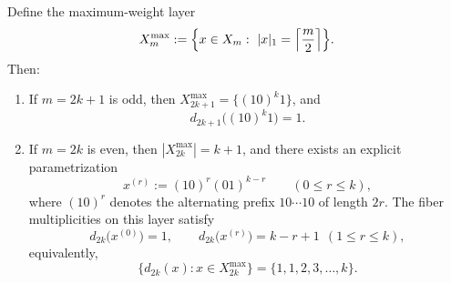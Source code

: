 \begin{conclusion}[Classification of stable words in the maximum-weight layer and closed fiber spectrum: \texorpdfstring{$|x|_1=\lceil m/2\rceil$}{|x|=ceil(m/2)}]\label{con:xi-terminal-max-weight-layer-fiber-spectrum-closed}
Define the maximum-weight layer
\[
X_m^{\max}:=\Bigl\{x\in X_m:\ |x|_1=\Bigl\lceil\frac{m}{2}\Bigr\rceil\Bigr\}.
\]
Then:
\begin{enumerate}
  \item If \(m=2k+1\) is odd, then \(X_{2k+1}^{\max}=\{(10)^k1\}\), and
  \[
  d_{2k+1}\bigl((10)^k1\bigr)=1.
  \]
  \item If \(m=2k\) is even, then \(|X_{2k}^{\max}|=k+1\), and there exists an explicit parametrization
  \[
  x^{(r)}:=(10)^r(01)^{k-r}\qquad(0\le r\le k),
  \]
  where \((10)^r\) denotes the alternating prefix \(10\cdots10\) of length \(2r\).
  The fiber multiplicities on this layer satisfy
  \[
  d_{2k}\bigl(x^{(0)}\bigr)=1,\qquad
  d_{2k}\bigl(x^{(r)}\bigr)=k-r+1\ \ (1\le r\le k),
  \]
  equivalently,
  \[
  \{d_{2k}(x):x\in X_{2k}^{\max}\}=\{1,1,2,3,\dots,k\}.
  \]
\end{enumerate}
\end{conclusion}
